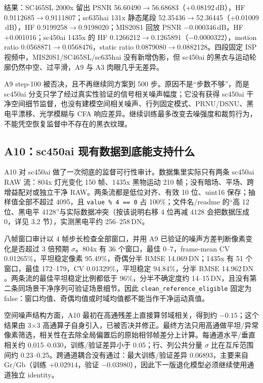 \documentclass[11pt,a4paper,UTF8,fontset=fandol]{ctexart}
\newcommand{\dn}{\ensuremath{\,\mathrm{DN}}}
\newcommand{\db}{\ensuremath{\,\mathrm{dB}}}
\begin{document}
结果：SC465SL 2000x 留出 PSNR 56.60490$\rightarrow$56.68683（+0.08192\db），HF 0.9112685$\rightarrow$0.9111807；sc635hai 131x 静态尾段 52.35436$\rightarrow$52.36445（+0.01009\db），HF 0.9199258$\rightarrow$0.9198020；MIS20S1 回放 PSNR $-0.000346$\db，HF +0.001016；sc450ai 1435x 的 HF 0.1266212$\rightarrow$0.1265891（$-0.0000322$），motion ratio 0.0568871$\rightarrow$0.0568476，static ratio 0.0879080$\rightarrow$0.0882128。四段固定 ISP 视频中，MIS20S1/SC465SL/sc635hai 没有新增伪影，但 sc450ai 的黑衣与运动轮廓仍然中空、过平滑，A9 与 A3 肉眼几乎无差异。

A9 step-100 被否决，且不再继续同方案到 500 步。原因不是“步数不够”，而是 sc450ai 分支只学了经过真实性验证的信号相关噪声幅度；它没有获得 sc450ai 干净空间细节监督，也没有建模空间相关噪声、行列固定模式、PRNU/DSNU、黑电平漂移、光学模糊与 CFA 响应差异。继续训练最多改变去噪强度和裁剪行为，不能凭空恢复监督中不存在的黑衣纹理。

\subsection{A10：sc450ai 现有数据到底能支持什么}

A10 对 sc450ai 做了一次彻底的监督可行性审计。数据集里实际只有两条 sc450ai RAW 流：804x 灯光变化 150 帧、1435x 黑物运动 210 帧；没有暗场、平场、跨增益配对或独立干净 RAW。两条流都是低位对齐、有效 10 位、uint16 保存；抽样值全部不超过 4095，且 \texttt{value \% 4 == 0} 占 100\%；文件名/readme 的“高 12 位、黑电平 4128”与实际数据冲突（按该说明右移 4 位再减 4128 会把数据压成 0，详见 3.2 节），实测黑电平约 256--258\dn。

八帧窗口审计以 4 帧步长检查全部窗口，并用 A9 已验证的噪声方差判断像素变化是否超过 3 倍预期 $\sigma$。804x 有 36 个窗口，最佳 0--7，frame-mean CV 0.01265\%，平坦稳定像素 95.49\%，奇偶分半 RMSE 14.069\dn；1435x 有 51 个窗口，最佳 172--179，CV 0.01329\%，平坦稳定 94.84\%，分半 RMSE 14.962\dn。两条流的最佳平坦稳定比例都低于 96\%，分半不确定度约 14--15\dn，且没有第二条同场景干净序列可验证场景细节。因此 \texttt{clean\_reference\_eligible} 固定为 false：窗口均值、奇偶均值或时域均值都不能当作干净运动真值。

空间噪声结构方面，A10 最初在高通残差上直接算邻域相关，得到约 $-0.15$；这个结果由 3$\times$3 高通算子自身引入，已被否决并修正。最终方法只用高通做平坦/异常像素筛选，相关性在去除全局偏置后的原始相邻帧差分上计算。每通道水平/垂直相关约 0.015--0.030，训练/验证差异小于 0.05；行、列公共分量 $\sigma$ 比在互斥范围间约 0.23--0.25。跨通道耦合没有通过：最大训练/验证差异 0.06893，主要来自 Gr/Gb（训练 $+0.02914$，验证 $-0.03980$），因此下一版退化模型必须继续使用通道独立 identity。
\end{document}
